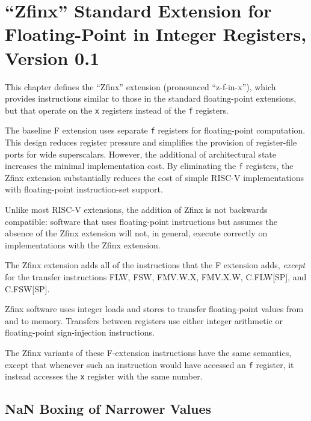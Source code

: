 \chapter{``Zfinx'' Standard Extension for Floating-Point in Integer Registers, Version 0.1}
\label{sec:zfinx}

This chapter defines the ``Zfinx'' extension (pronounced ``z-f-in-x''), which
provides instructions similar to those in the standard floating-point
extensions, but that operate on the {\tt x} registers instead of the {\tt f}
registers.

\begin{commentary}
The baseline F extension uses separate {\tt f} registers for floating-point
computation.
This design reduces register pressure and simplifies the provision of
register-file ports for wide superscalars.
However, the additional  of architectural state increases the
minimal implementation cost.
By eliminating the {\tt f} registers, the Zfinx extension substantially
reduces the cost of simple RISC-V implementations with floating-point
instruction-set support.

Unlike most RISC-V extensions, the addition of Zfinx is not backwards
compatible: software that uses floating-point instructions but assumes the
absence of the Zfinx extension will not, in general, execute correctly on
implementations with the Zfinx extension.
\end{commentary}

The Zfinx extension adds all of the instructions that the F extension
adds, {\em except} for the transfer instructions FLW, FSW, FMV.W.X,
FMV.X.W, C.FLW[SP], and C.FSW[SP].

\begin{commentary}
Zfinx software uses integer loads and stores to transfer floating-point values
from and to memory.
Transfers between registers use either integer arithmetic or floating-point
sign-injection instructions.
\end{commentary}

The Zfinx variants of these F-extension instructions have the same semantics,
except that whenever such an instruction would have accessed an {\tt f}
register, it instead accesses the {\tt x} register with the same number.

\section{NaN Boxing of Narrower Values}

